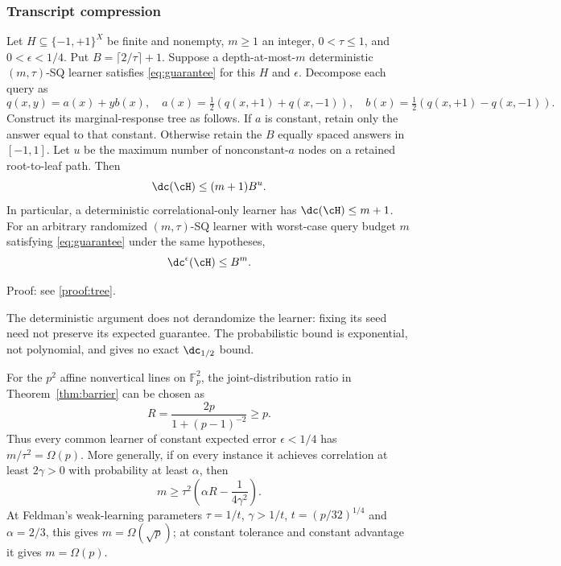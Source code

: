 \subsubsection{Transcript compression}

\begin{theorem}\label{thm:tree}
Let $H\subseteq\{-1,+1\}^X$ be finite and nonempty, $m\ge1$ an integer, $0<\tau\le1$, and $0<\epsilon<1/4$. Put $B=\lceil2/\tau\rceil+1$. Suppose a depth-at-most-$m$ deterministic $(m,\tau)$-SQ learner satisfies \eqref{eq:guarantee} for this $H$ and $\epsilon$. Decompose each query as
\[
 q(x,y)=a(x)+yb(x),\quad
 a(x)=\tfrac12(q(x,+1)+q(x,-1)),\quad
 b(x)=\tfrac12(q(x,+1)-q(x,-1)).
\]
Construct its marginal-response tree as follows. If $a$ is constant, retain only the answer equal to that constant. Otherwise retain the $B$ equally spaced answers in $[-1,1]$. Let $u$ be the maximum number of nonconstant-$a$ nodes on a retained root-to-leaf path. Then
\begin{equation}\label{eq:tree}
 \dc(\cH)\leq(m+1)B^u.
\end{equation}
In particular, a deterministic correlational-only learner has $\dc(\cH)\leq m+1$.
For an arbitrary randomized $(m,\tau)$-SQ learner with worst-case query budget $m$ satisfying \eqref{eq:guarantee} under the same hypotheses,
\begin{equation}\label{eq:approx}
 \dc^{\epsilon}(\cH)\leq B^m.
\end{equation}
\end{theorem}

\noindent Proof: see \cref{proof:tree}.\par


The deterministic argument does not derandomize the learner: fixing its seed need not preserve its expected guarantee. The probabilistic bound is exponential, not polynomial, and gives no exact $\dc_{1/2}$ bound.



\begin{proposition}\label{prop:affine}
For the $p^2$ affine nonvertical lines on $\mathbb F_p^2$, the joint-distribution ratio in Theorem~\ref{thm:barrier} can be chosen as
\[
 R=\frac{2p}{1+(p-1)^{-2}}\ge p.
\]
Thus every common learner of constant expected error $\epsilon<1/4$ has $m/\tau^2=\Omega(p)$. More generally, if on every instance it achieves correlation at least $2\gamma>0$ with probability at least $\alpha$, then
\[
 m\ge\tau^2\left(\alpha R-\frac1{4\gamma^2}\right).
\]
At Feldman's weak-learning parameters $\tau=1/t$, $\gamma>1/t$, $t=(p/32)^{1/4}$ and $\alpha=2/3$, this gives $m=\Omega(\sqrt p)$; at constant tolerance and constant advantage it gives $m=\Omega(p)$.
\end{proposition}

